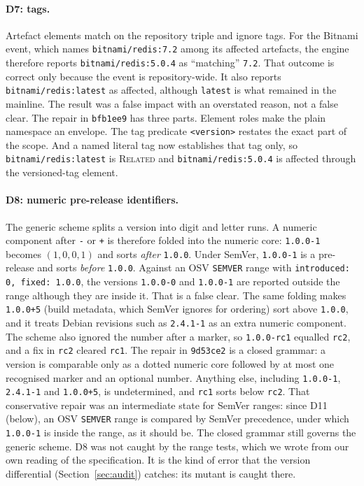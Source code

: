 \documentclass[11pt,a4paper]{article}
\newcommand{\code}[1]{\texttt{#1}}
\newcommand{\deightcommit}{\code{9d53ce2}}
\newcommand{\dsevencommit}{\code{bfb1ee9}}
\begin{document}
\paragraph{D7: tags.} Artefact elements match on the repository triple
and ignore tags. For the Bitnami event, which names
\code{bitnami/redis:7.2} among its affected artefacts, the engine
therefore reports \code{bitnami/redis:5.0.4} as ``matching''
\code{7.2}. That outcome is correct only because the event is
repository-wide. It also reports \code{bitnami/redis:latest} as
affected, although \code{latest} is what remained in the mainline.
The result was a false impact with an overstated reason, not a false
clear. The repair in \dsevencommit{} has three parts. Element roles
make the plain namespace an envelope. The tag predicate
\code{<version>} restates the exact part of the scope. And a named
literal tag now establishes that tag only, so \code{bitnami/redis:latest}
is \textsc{Related} and \code{bitnami/redis:5.0.4} is affected through
the versioned-tag element.

\paragraph{D8: numeric pre-release identifiers.} The generic scheme
splits a version into digit and letter runs. A numeric component after
\code{-} or \code{+} is therefore folded into the numeric core:
\code{1.0.0-1} becomes $(1,0,0,1)$ and sorts \emph{after}
\code{1.0.0}. Under SemVer, \code{1.0.0-1} is a pre-release and sorts
\emph{before} \code{1.0.0}. Against an OSV \code{SEMVER} range with
\code{introduced: 0, fixed: 1.0.0}, the versions \code{1.0.0-0} and
\code{1.0.0-1} are reported outside the range although they are inside
it. That is a false clear. The same folding makes \code{1.0.0+5}
(build metadata, which SemVer ignores for ordering) sort above
\code{1.0.0}, and it treats Debian revisions such as \code{2.4.1-1} as
an extra numeric component. The scheme also ignored the number after a
marker, so \code{1.0.0-rc1} equalled \code{rc2}, and a fix in
\code{rc2} cleared \code{rc1}. The repair in \deightcommit{} is a
closed grammar: a version is comparable only as a dotted numeric core
followed by at most one recognised marker and an optional number.
Anything else, including \code{1.0.0-1}, \code{2.4.1-1} and
\code{1.0.0+5}, is undetermined, and \code{rc1} sorts below
\code{rc2}. That conservative repair was an intermediate state for
SemVer ranges: since D11 (below), an OSV \code{SEMVER} range is
compared by SemVer precedence, under which \code{1.0.0-1} is inside
the range, as it should be. The closed grammar still governs the
generic scheme. D8 was not caught by the range tests, which we wrote from
our own reading of the specification. It is the kind of error that
the version differential (Section~\ref{sec:audit}) catches: its mutant
is caught there.
\end{document}

